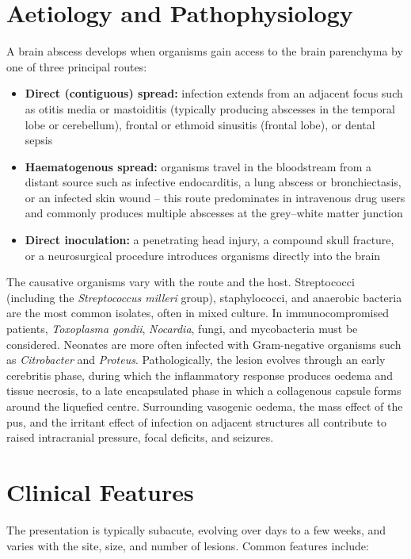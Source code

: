 \section*{Aetiology and Pathophysiology}
A brain abscess develops when organisms gain access to the brain parenchyma by one of three principal routes:

\begin{itemize}
    \item \textbf{Direct (contiguous) spread:} infection extends from an adjacent focus such as otitis media or mastoiditis (typically producing abscesses in the temporal lobe or cerebellum), frontal or ethmoid sinusitis (frontal lobe), or dental sepsis
    \item \textbf{Haematogenous spread:} organisms travel in the bloodstream from a distant source such as infective endocarditis, a lung abscess or bronchiectasis, or an infected skin wound -- this route predominates in intravenous drug users and commonly produces multiple abscesses at the grey--white matter junction
    \item \textbf{Direct inoculation:} a penetrating head injury, a compound skull fracture, or a neurosurgical procedure introduces organisms directly into the brain
\end{itemize}

The causative organisms vary with the route and the host. Streptococci (including the \textit{Streptococcus milleri} group), staphylococci, and anaerobic bacteria are the most common isolates, often in mixed culture. In immunocompromised patients, \textit{Toxoplasma gondii}, \textit{Nocardia}, fungi, and mycobacteria must be considered. Neonates are more often infected with Gram-negative organisms such as \textit{Citrobacter} and \textit{Proteus}. Pathologically, the lesion evolves through an early cerebritis phase, during which the inflammatory response produces oedema and tissue necrosis, to a late encapsulated phase in which a collagenous capsule forms around the liquefied centre. Surrounding vasogenic oedema, the mass effect of the pus, and the irritant effect of infection on adjacent structures all contribute to raised intracranial pressure, focal deficits, and seizures.

\section*{Clinical Features}
The presentation is typically subacute, evolving over days to a few weeks, and varies with the site, size, and number of lesions. Common features include:

